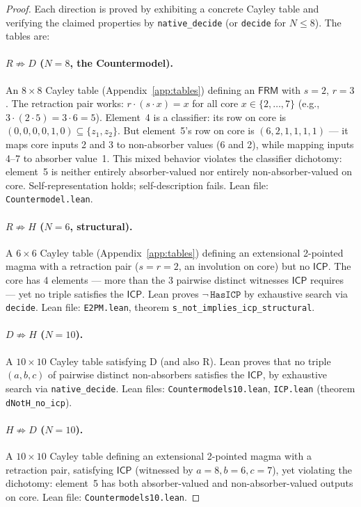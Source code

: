 \documentclass[sigconf,screen,review,anonymous]{acmart}
\newcommand{\dotop}{\cdot}
\newcommand{\FRM}{\textsf{FRM}}
\newcommand{\ICP}{\textsf{ICP}}
\theoremstyle{remark}
\begin{document}
\begin{proof}
Each direction is proved by exhibiting a concrete Cayley table and verifying the claimed properties by \texttt{native\_decide} (or \texttt{decide} for $N \leq 8$). The tables are:

\paragraph{$R \not\Rightarrow D$ ($N\!=\!8$, the Countermodel).}
An $8 \times 8$ Cayley table (Appendix~\ref{app:tables}) defining an $\FRM$ with $s = 2$, $r = 3$. The retraction pair works: $r \dotop (s \dotop x) = x$ for all core $x \in \{2,\ldots,7\}$ (e.g., $3 \dotop (2 \dotop 5) = 3 \dotop 6 = 5$). Element~4 is a classifier: its row on core is $(0,0,0,0,1,0) \subseteq \{z_1, z_2\}$. But element~5's row on core is $(6, 2, 1, 1, 1, 1)$ --- it maps core inputs 2 and 3 to non-absorber values (6 and 2), while mapping inputs 4--7 to absorber value~1. This mixed behavior violates the classifier dichotomy: element~5 is neither entirely absorber-valued nor entirely non-absorber-valued on core. Self-representation holds; self-description fails. Lean file: \texttt{Countermodel.lean}.

\paragraph{$R \not\Rightarrow H$ ($N\!=\!6$, structural).}
A $6 \times 6$ Cayley table (Appendix~\ref{app:tables}) defining an extensional 2-pointed magma with a retraction pair ($s = r = 2$, an involution on core) but no $\ICP$. The core has 4 elements --- more than the 3 pairwise distinct witnesses $\ICP$ requires --- yet no triple satisfies the $\ICP$. Lean proves $\neg\,\texttt{HasICP}$ by exhaustive search via \texttt{decide}. Lean file: \texttt{E2PM.lean}, theorem \texttt{s\_not\_implies\_icp\_structural}.

\paragraph{$D \not\Rightarrow H$ ($N\!=\!10$).}
A $10 \times 10$ Cayley table satisfying D (and also R). Lean proves that no triple $(a, b, c)$ of pairwise distinct non-absorbers satisfies the $\ICP$, by exhaustive search via \texttt{native\_decide}. Lean files: \texttt{Countermodels10.lean}, \texttt{ICP.lean} (theorem \texttt{dNotH\_no\_icp}).

\paragraph{$H \not\Rightarrow D$ ($N\!=\!10$).}
A $10 \times 10$ Cayley table defining an extensional 2-pointed magma with a retraction pair, satisfying $\ICP$ (witnessed by $a\!=\!8, b\!=\!6, c\!=\!7$), yet violating the dichotomy: element~5 has both absorber-valued and non-absorber-valued outputs on core. Lean file: \texttt{Countermodels10.lean}.


\end{proof}
\end{document}
